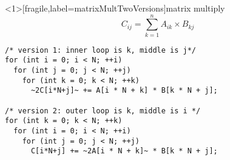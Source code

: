 \begin{frame}<1>[fragile,label=matrixMultTwoVersions]{matrix multiply}
\[ C_{ij} = \sum_{k=1}^n A_{ik}\times B_{kj} \]
\begin{lstlisting}
/* version 1: inner loop is k, middle is j*/
for (int i = 0; i < N; ++i)
  for (int j = 0; j < N; ++j)
    for (int k = 0; k < N; ++k)
      ~2C[i*N+j]~ += A[i * N + k] * B[k * N + j];

/* version 2: outer loop is k, middle is i */
for (int k = 0; k < N; ++k)
  for (int i = 0; i < N; ++i)
    for (int j = 0; j < N; ++j)
      C[i*N+j] += ~2A[i * N + k]~ * B[k * N + j];
\end{lstlisting}
\end{frame}

